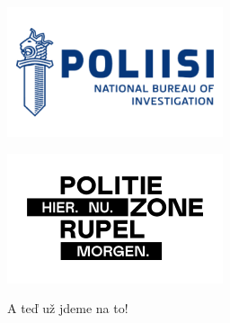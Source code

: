 \documentclass{beamer}
\begin{document}
\begin{frame}
{{\begin{minipage}{.15\textwidth}\includegraphics[width=\columnwidth]{../img/logo_nbi.png}\end{minipage}%
\begin{minipage}{.15\textwidth}\includegraphics[width=\columnwidth]{../img/logo_lpr.png}\end{minipage}%
}
}

\end{frame}


\begin{frame}[plain]
\centering

A teď už jdeme na to!

\end{frame}
\end{document}
